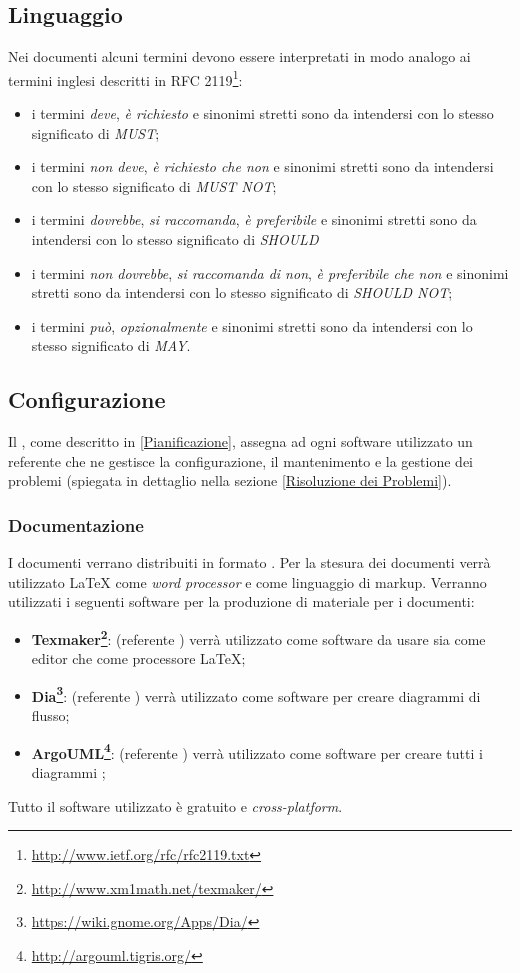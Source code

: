 \documentclass[12pt,a4paper]{article}
\begin{document}
\subsection{Linguaggio}
Nei documenti alcuni termini devono essere interpretati in modo analogo ai termini inglesi descritti in RFC 2119\footnote{\url{http://www.ietf.org/rfc/rfc2119.txt}}:
\begin{itemize}
  \item i termini \emph{deve}, \emph{è richiesto} e sinonimi stretti sono da intendersi con lo stesso significato di \emph{MUST};
  \item i termini \emph{non deve}, \emph{è richiesto che non} e sinonimi stretti sono da intendersi con lo stesso significato di \emph{MUST NOT};
  \item i  termini \emph{dovrebbe}, \emph{si raccomanda}, \emph{è preferibile} e sinonimi stretti sono da intendersi con lo stesso significato di \emph{SHOULD}
  \item i termini \emph{non dovrebbe}, \emph{si raccomanda di non}, \emph{è preferibile che non} e sinonimi stretti sono da intendersi con lo stesso significato di \emph{SHOULD NOT};
  \item i termini \emph{può}, \emph{opzionalmente} e sinonimi stretti sono da intendersi con lo stesso significato di \emph{MAY}.
\end{itemize}

\subsection{Configurazione} %
Il \PM, come descritto in \ref{Pianificazione}, assegna ad ogni software utilizzato un referente che ne gestisce la configurazione, il mantenimento e la gestione dei problemi (spiegata in dettaglio nella sezione \ref{Risoluzione dei Problemi}).

\subsubsection{Documentazione}
I documenti verrano distribuiti in formato . Per la stesura dei documenti verrà utilizzato \LaTeX{} come \emph{word processor} e come linguaggio di markup. Verranno utilizzati i seguenti software per la produzione di materiale per i documenti:
\begin{itemize}
  \item \textbf{Texmaker\footnote{\url{http://www.xm1math.net/texmaker/}}}: (referente \NDC) verrà utilizzato come software da usare sia come editor che come processore \LaTeX;
  \item \textbf{Dia\footnote{\url{https://wiki.gnome.org/Apps/Dia/}}}: (referente \TODO{}) verrà utilizzato come software per creare diagrammi di flusso;
  \item \textbf{ArgoUML\footnote{\url{http://argouml.tigris.org/}}}: (referente \TODO{}) verrà utilizzato come software per creare tutti i diagrammi ;
\end{itemize}
Tutto il software utilizzato è gratuito e \emph{cross-platform}.
\end{document}
